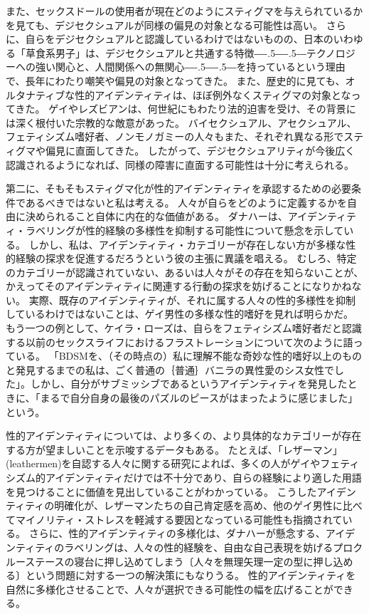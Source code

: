 \documentclass[paper=a4,book,openany]{jlreq}
\def\DDASH{―\kern-.5\zw―\kern-.5\zw―} %
\begin{document}
また、セックスドールの使用者が現在どのようにスティグマを与えられているかを見ても、デジセクシュアルが同様の偏見の対象となる可能性は高い\citep{knox17:_sex_dolls}。
さらに、自らをデジセクシュアルと認識しているわけではないものの、日本のいわゆる「草食系男子」は、デジセクシュアルと共通する特徴{\DDASH}テクノロジーへの強い関心と、人間関係への無関心{\DDASH}を持っているという理由で、長年にわたり嘲笑や偏見の対象となってきた\citep{harney09:_herbiv_dilem}。
また、歴史的に見ても、オルタナティブな性的アイデンティティは、ほぼ例外なくスティグマの対象となってきた。
ゲイやレズビアンは、何世紀にもわたり法的迫害を受け、その背景には深く根付いた宗教的な敵意があった。
バイセクシュアル、アセクシュアル、フェティシズム嗜好者、ノンモノガミーの人々もまた、それぞれ異なる形でスティグマや偏見に直面してきた\citep{klein06:_sm_sadom_inter_issue_child_custod_proceed,wright06:_discr_sm_ident_indiv,balzarini18:_dimmin_halo_aroun_monog,rothblum20:_asexual_non_asexual_respon_u}。
したがって、デジセクシュアリティが今後広く認識されるようになれば、同様の障害に直面する可能性は十分に考えられる。

第二に、そもそもスティグマ化が性的アイデンティティを承認するための必要条件であるべきではないと私は考える。
人々が自らをどのように定義するかを自由に決められること自体に内在的な価値がある。
ダナハーは、アイデンティティ・ラベリングが性的経験の多様性を抑制する可能性について懸念を示している。
しかし、私は、アイデンティティ・カテゴリーが存在しない方が多様な性的経験の探求を促進するだろうという彼の主張に異議を唱える。
むしろ、特定のカテゴリーが認識されていない、あるいは人々がその存在を知らないことが、かえってそのアイデンティティに関連する行動の探求を妨げることになりかねない。
実際、既存のアイデンティティが、それに属する人々の性的多様性を抑制しているわけではないことは、ゲイ男性の多様な性的嗜好を見れば明らかだ。
もう一つの例として、ケイラ・ローズは、自らをフェティシズム嗜好者だと認識する以前のセックスライフにおけるフラストレーションについて次のように語っている。
「BDSMを、（その時点の）私に理解不能な奇妙な性的嗜好以上のものと発見するまでの私は、ごく普通の｛普通｝{バニラ}の異性愛のシス女性でした」。しかし、自分がサブミッシブであるというアイデンティティを発見したときに、「まるで自分自身の最後のパズルのピースがはまったように感じました」という\citep{lords:sexual_submission}。

性的アイデンティティについては、より多くの、より具体的なカテゴリーが存在する方が望ましいことを示唆するデータもある。
たとえば、「レザーマン」(leathermen)を自認する人々に関する研究によれば、多くの人がゲイやフェティシズム的アイデンティティだけでは不十分であり、自らの経験により適した用語を見つけることに価値を見出していることがわかっている\citep{kamel80:_leath}。
こうしたアイデンティティの明確化が、レザーマンたちの自己肯定感を高め、他のゲイ男性に比べてマイノリティ・ストレスを軽減する要因となっている可能性も指摘されている\citep{mosher16:_layer_leath,tatum16:_proxim_minor_stres_proces_subjec}。
さらに、性的アイデンティティの多様化は、ダナハーが懸念する、アイデンティティのラベリングは、人々の性的経験を、自由な自己表現を妨げるプロクルーステースの寝台に押し込めてしまう〔人々を無理矢理一定の型に押し込める〕という問題に対する一つの解決策にもなりうる。
性的アイデンティティを自然に多様化させることで、人々が選択できる可能性の幅を広げることができる。
\end{document}
